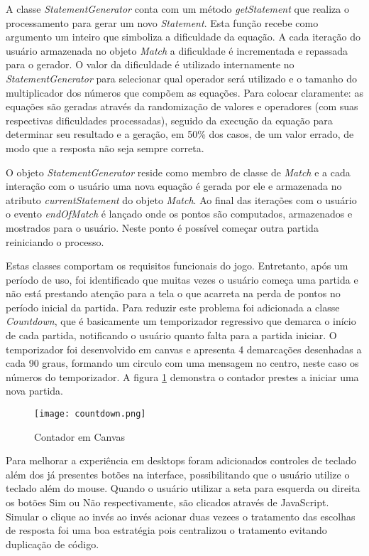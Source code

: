 A classe \textit{StatementGenerator} conta com um método
\textit{getStatement} que realiza o processamento para gerar um novo
\textit{Statement}. Esta função recebe como argumento um inteiro que
simboliza a dificuldade da equação. A cada iteração do usuário
armazenada no objeto \textit{Match} a dificuldade é incrementada
e repassada para o gerador. O valor da dificuldade é utilizado
internamente no \textit{StatementGenerator} para selecionar qual
operador será utilizado e o tamanho do multiplicador dos números
que compõem as equações. Para colocar claramente: as equações
são geradas através da randomização de valores e operadores (com
suas respectivas dificuldades processadas), seguido da execução da
equação para determinar seu resultado e a geração, em 50\% dos
casos, de um valor errado, de modo que a resposta não seja sempre
correta.

O objeto \textit{StatementGenerator} reside como membro de classe de
\textit{Match} e a cada interação com o usuário uma nova equação
é gerada por ele e armazenada no atributo \textit{currentStatement}
do objeto \textit{Match}. Ao final das iterações com o usuário o
evento \textit{endOfMatch} é lançado onde os pontos são computados,
armazenados e mostrados para o usuário. Neste ponto é possível
começar outra partida reiniciando o processo.

Estas classes comportam os requisitos funcionais do jogo. Entretanto,
após um período de uso, foi identificado que muitas vezes o usuário
começa uma partida e não está prestando atenção para a tela o
que acarreta na perda de pontos no período inicial da partida. Para
reduzir este problema foi adicionada a classe \textit{Countdown},
que é basicamente um temporizador regressivo que demarca o início
de cada partida, notificando o usuário quanto falta para a partida
iniciar. O temporizador foi desenvolvido em canvas e apresenta 4
demarcações desenhadas a cada 90 graus, formando um circulo com uma
mensagem no centro, neste caso os números do temporizador. A figura
\ref{fig:counter} demonstra o contador prestes a iniciar uma nova
partida.

\begin{figure}
    \centering
    \texttt{[image: countdown.png]}
	\caption{Contador em Canvas}
    \label{fig:counter}
\end{figure}

Para melhorar a experiência em desktops foram adicionados controles de
teclado além dos já presentes botões na interface, possibilitando que
o usuário utilize o teclado além do mouse. Quando o usuário utilizar
a seta para esquerda ou direita os botões Sim ou Não respectivamente,
são clicados através de JavaScript. Simular o clique ao invés ao
invés acionar duas vezees o tratamento das escolhas de resposta foi uma boa
estratégia pois centralizou o tratamento evitando duplicação de código.

